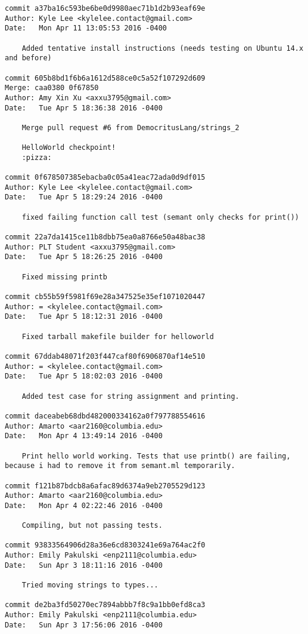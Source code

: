 \begin{lstlisting}[backgroundcolor=\color{white}]
commit a37ba16c593be6be0d9980aec71b1d2b93eaf69e
Author: Kyle Lee <kylelee.contact@gmail.com>
Date:   Mon Apr 11 13:05:53 2016 -0400

    Added tentative install instructions (needs testing on Ubuntu 14.x and before)

commit 605b8bd1f6b6a1612d588ce0c5a52f107292d609
Merge: caa0380 0f67850
Author: Amy Xin Xu <axxu3795@gmail.com>
Date:   Tue Apr 5 18:36:38 2016 -0400

    Merge pull request #6 from DemocritusLang/strings_2
    
    HelloWorld checkpoint!
    :pizza:

commit 0f678507385ebacba0c05a41eac72ada0d9df015
Author: Kyle Lee <kylelee.contact@gmail.com>
Date:   Tue Apr 5 18:29:24 2016 -0400

    fixed failing function call test (semant only checks for print())

commit 22a7da1415ce11b8dbb75ea0a8766e50a48bac38
Author: PLT Student <axxu3795@gmail.com>
Date:   Tue Apr 5 18:26:25 2016 -0400

    Fixed missing printb

commit cb55b59f5981f69e28a347525e35ef1071020447
Author: = <kylelee.contact@gmail.com>
Date:   Tue Apr 5 18:12:31 2016 -0400

    Fixed tarball makefile builder for helloworld

commit 67ddab48071f203f447caf80f6906870af14e510
Author: = <kylelee.contact@gmail.com>
Date:   Tue Apr 5 18:02:03 2016 -0400

    Added test case for string assignment and printing.

commit daceabeb68dbd482000334162a0f797788554616
Author: Amarto <aar2160@columbia.edu>
Date:   Mon Apr 4 13:49:14 2016 -0400

    Print hello world working. Tests that use printb() are failing, because i had to remove it from semant.ml temporarily.

commit f121b87bdcb8a6afac89d6374a9eb2705529d123
Author: Amarto <aar2160@columbia.edu>
Date:   Mon Apr 4 02:22:46 2016 -0400

    Compiling, but not passing tests.

commit 93833564906d28a36e6cd8303241e69a764ac2f0
Author: Emily Pakulski <enp2111@columbia.edu>
Date:   Sun Apr 3 18:11:16 2016 -0400

    Tried moving strings to types...

commit de2ba3fd50270ec7894abbb7f8c9a1bb0efd8ca3
Author: Emily Pakulski <enp2111@columbia.edu>
Date:   Sun Apr 3 17:56:06 2016 -0400


\end{lstlisting}

